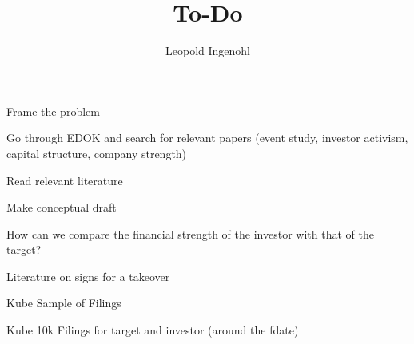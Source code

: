 \documentclass{article}
\title{To-Do}
\author{Leopold Ingenohl}
\newcommand{\cmark}{\ding{51}}%
\newcommand{\done}{\rlap{$\square$}{\raisebox{2pt}{\large\hspace{1pt}\cmark}}%
\hspace{-2.5pt}}
\begin{document}
\maketitle


  \begin{todolist}
  \item[\done] Frame the problem
  \end{todolist}

\begin{todolist}

  \item [\done] Go through EDOK and search for relevant papers (event study, investor activism, capital structure, company strength)
  \item Read relevant literature
  \item Make conceptual draft 
  \item How can we compare the financial strength of the investor with that of the target?
  \item Literature on signs for a takeover
  \item Kube Sample of Filings
  \item Kube 10k Filings for target and investor (around the fdate)
  \item 

\end{todolist}
\end{document}
